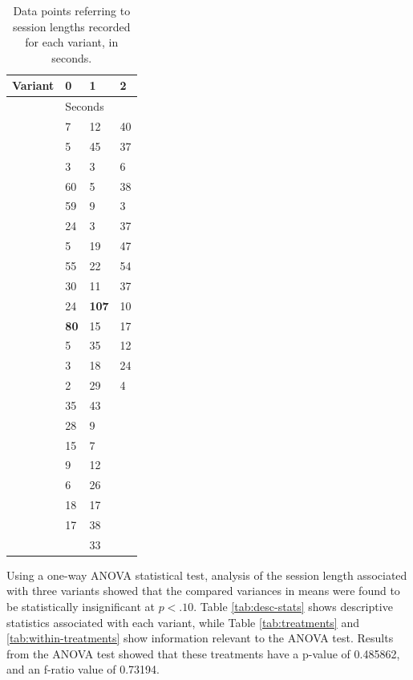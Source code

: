 \documentclass[conference]{IEEEtran}
\begin{document}
\begin{table}
\centering
\caption{Data points referring to session lengths recorded for each variant, in seconds.}
\label{tab:variant-length}
\begin{tabular}{llll} 
\toprule
Variant & 0            & 1             & 2   \\ 
\midrule
        & \multicolumn{3}{l}{Seconds}        \\ 
\cline{2-4}
        & 7            & 12            & 40  \\
        & 5            & 45            & 37  \\
        & 3            & 3             & 6   \\
        & 60           & 5             & 38  \\
        & 59           & 9             & 3   \\
        & 24           & 3             & 37  \\
        & 5            & 19            & 47  \\
        & 55           & 22            & 54  \\
        & 30           & 11            & 37  \\
        & 24           & \textbf{107 } & 10  \\
        & \textbf{80}  & 15            & 17  \\
        & 5            & 35            & 12  \\
        & 3            & 18            & 24  \\
        & 2            & 29            & 4   \\
        & 35           & 43            &     \\
        & 28           & 9             &     \\
        & 15           & 7             &     \\
        & 9            & 12            &     \\
        & 6            & 26            &     \\
        & 18           & 17            &     \\
        & 17           & 38            &     \\
        &              & 33            &     \\
\bottomrule
\end{tabular}
\end{table}


Using a one-way ANOVA statistical test, analysis of the session length associated with three variants showed that the compared variances in means were found to be statistically insignificant at \(p < .10\). Table \ref{tab:desc-stats} shows descriptive statistics associated with each variant, while Table \ref{tab:treatments} and \ref{tab:within-treatments} show information relevant to the ANOVA test. Results from the ANOVA test showed that these treatments have a p-value of 0.485862, and an f-ratio value of 0.73194.
\end{document}
